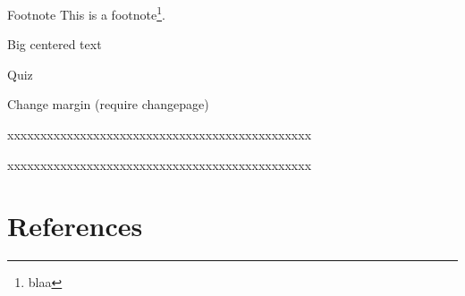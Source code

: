 \documentclass[table]{beamer}
\begin{document}
\begin{frame}[label={sec:orga5a5f58}]{Footnote}
This is a footnote\footnote{blaa}.
\end{frame}
\begin{frame}[label={sec:orgad3b4b9}]{Big centered text}
\vfill

\begin{center}
\Huge Quiz
\end{center}

\vfill
\end{frame}

\begin{frame}[label={sec:orgd7a186e}]{Change margin}
(require changepage)
\begin{adjustwidth}{-1em}{-1em}
xxxxxxxxxxxxxxxxxxxxxxxxxxxxxxxxxxxxxxxxxxxxxx
\end{adjustwidth}
\begin{adjustwidth}{-3em}{-3em}
xxxxxxxxxxxxxxxxxxxxxxxxxxxxxxxxxxxxxxxxxxxxxx
\end{adjustwidth}
\end{frame}


\section{References}
\label{sec:org9a67c8b}
\begingroup
\renewcommand{\section}[2]{}



\endgroup
\end{document}
